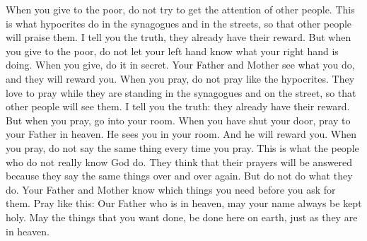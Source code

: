 When you give to the poor, do not try to get the attention of other people. This is what hypocrites do in the synagogues and in the streets, so that other people will praise them. I tell you the truth, they already have their reward.
\bverse \iffalse But when thou doest alms let not thy left hand know what thy right hand doeth; \fi
But when you give to the poor, do not let your left hand know what your right hand is doing.
\bverse \iffalse That thine alms may be in secret; and thy Father who seeth in secret, himself shall reward thee openly. \fi
When you give, do it in secret. Your Father and Mother see what you do, and they will reward you.
\bverse \iffalse And when thou prayest thou shalt not do as the hypocrites, for they love to pray, standing in the synagogues and in the corners of the streets, that they may be seen of men. Verily I say unto you, they have their reward. \fi
When you pray, do not pray like the hypocrites. They love to pray while they are standing in the synagogues and on the street, so that other people will see them. I tell you the truth: they already have their reward.
\bverse \iffalse But thou, when thou prayest, enter into thy closet, and when thou hast shut thy door, pray to thy Father who is in secret; and thy Father, who seeth in secret, shall reward thee openly. \fi
But when you pray, go into your room. When you have shut your door, pray to your Father in heaven. He sees you in your room. And he will reward you.
\bverse \iffalse But when ye pray, use not vain repetitions, as the heathen, for they think that they shall be heard for their much speaking. \fi
When you pray, do not say the same thing every time you pray. This is what the people who do not really know God do. They think that their prayers will be answered because they say the same things over and over again.
\bverse \iffalse Be not ye therefore like unto them, for your Father knoweth what things ye have need of before ye ask him. \fi
But do not do what they do. Your Father and Mother know which things you need before you ask for them.
\bverse \iffalse After this manner therefore pray ye: Our Father who art in heaven, hallowed be thy name. \fi
Pray like this: Our Father who is in heaven, may your name always be kept holy.
\bverse \iffalse Thy will be done on earth as it is in heaven. \fi
May the things that you want done, be done here on earth, just as they are in heaven.
\bverse \iffalse And forgive us our debts, as we forgive our debtors. \fi
